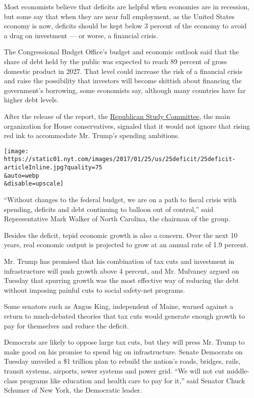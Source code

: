 Most economists believe that deficits are helpful when economies are in
recession, but some say that when they are near full employment, as the
United States economy is now, deficits should be kept below 3 percent of
the economy to avoid a drag on investment --- or worse, a financial
crisis.

The Congressional Budget Office's budget and economic outlook said that
the share of debt held by the public was expected to reach 89 percent of
gross domestic product in 2027. That level could increase the risk of a
financial crisis and raise the possibility that investors will become
skittish about financing the government's borrowing, some economists
say, although many countries have far higher debt levels.

After the release of the report, the
\href{http://rsc.walker.house.gov/}{Republican Study Committee}, the
main organization for House conservatives, signaled that it would not
ignore that rising red ink to accommodate Mr. Trump's spending
ambitions.

\texttt{[image: https://static01.nyt.com/images/2017/01/25/us/25deficit/25deficit-articleInline.jpg?quality=75\\\&auto=webp\\\&disable=upscale]}

``Without changes to the federal budget, we are on a path to fiscal
crisis with spending, deficits and debt continuing to balloon out of
control,'' said Representative Mark Walker of North Carolina, the
chairman of the group.

Besides the deficit, tepid economic growth is also a concern. Over the
next 10 years, real economic output is projected to grow at an annual
rate of 1.9 percent.

Mr. Trump has promised that his combination of tax cuts and investment
in infrastructure will push growth above 4 percent, and Mr. Mulvaney
argued on Tuesday that spurring growth was the most effective way of
reducing the debt without imposing painful cuts to social safety-net
programs.

Some senators such as Angus King, independent of Maine, warned against a
return to much-debated theories that tax cuts would generate enough
growth to pay for themselves and reduce the deficit.

Democrats are likely to oppose large tax cuts, but they will press Mr.
Trump to make good on his promise to spend big on infrastructure. Senate
Democrats on Tuesday unveiled a \$1 trillion plan to rebuild the
nation's roads, bridges, rails, transit systems, airports, sewer systems
and power grid. ``We will not cut middle-class programs like education
and health care to pay for it,'' said Senator Chuck Schumer of New York,
the Democratic leader.

